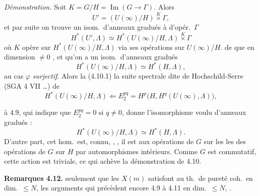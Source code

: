 \documentclass[11pt,a4paper]{article}
\begin{document}
\emph{Démonstration.} Soit $K = G/H = \operatorname{Im}(G \to \Gamma)$. Alors
\[
U' = (U(\infty)/H) \overset{K}{\times} \Gamma ,
\]
et par suite on trouve un isom.\ d'anneaux gradués à  d'opér.\ $\Gamma$
\[
H^*(U', \Lambda) \simeq H^*(U(\infty)/H, \Lambda) \overset{K}{\times} \Gamma
\]
où $K$ opère sur $H^*(U(\infty)/H, \Lambda)$ via ses opérations sur $U(\infty)/H$.     de  que en dimension $\neq 0$ \struck{\ill{}} , \struck{\ill{} \ill{}} et qu'on a un isom.\ d'anneaux gradués
\[
H^*(U(\infty)/H, \Lambda) \simeq H^*(H, \Lambda) ,
\]
   au cas  $\varphi$   \emph{surjectif}. Alors la   \ill{} (4.10.1)  la suite spectrale dite de Hochschild-Serre (SGA 4 VII …) de
\[
H^*(U(\infty)/H, \Lambda) \Longleftarrow E_2^{pq} = H^p\bigl(H, H^q(U(\infty), \Lambda)\bigr) ,
\]


 à 4.9, qui indique que $E_2^{pq} = 0$ si $q \neq 0$, donne l'isomorphisme voulu d'anneaux gradués :
\[
H^*(U(\infty)/H, \Lambda) \simeq H^*(H, \Lambda) .
\]
D'autre part, cet hom.\ est,   connu, ,  \ill{}, il est  aux opérations de $G$ sur les   \uncertain{(}les  \ill{} des opérations de $G$ sur $H$ par automorphismes intérieurs. Comme $G$ est commutatif, cette action est triviale, ce qui achève la démonstration de 4.10.

\textbf{Remarques 4.12.}    seulement que les $X(m)$ satisfont au th.\ de pureté coh.\ en dim.\ $\leq N$,  les arguments qui précèdent  encore 4.9 à 4.11 en dim.\ $\leq N$,  .
\end{document}
